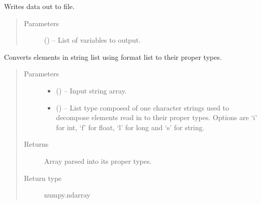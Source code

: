 \documentclass[a4paper,10pt,openany,english]{sphinxmanual}
\begin{document}
\begin{fulllineitems}
\begin{fulllineitems}
\begin{quote}
\begin{description}
\end{description}\end{quote}

\end{fulllineitems}


\begin{fulllineitems}
\label{egadsapi:egads.input.text_file_io.EgadsCsv.writerows}
Writes data out to file.
\begin{quote}\begin{description}
\item[{Parameters}] \leavevmode
{} () -- List of variables to output.

\end{description}\end{quote}

\end{fulllineitems}


\end{fulllineitems}


\begin{fulllineitems}
\label{egadsapi:egads.input.text_file_io.parse_string_array}
Converts elements in string list using format list to their proper types.
\begin{quote}\begin{description}
\item[{Parameters}] \leavevmode\begin{itemize}
\item {} 
 () -- Input string array.

\item {} 
 () -- List type composed of one character strings used to decompose elements
read in to their proper types. Options are `i' for int, `f' for float,
`l' for long and `s' for string.

\end{itemize}

\item[{Returns}] \leavevmode
Array parsed into its proper types.

\item[{Return type}] \leavevmode
numpy.ndarray

\end{description}\end{quote}

\end{fulllineitems}
\end{document}
